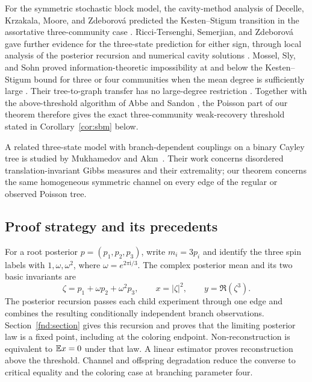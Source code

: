 For the symmetric stochastic block model, the cavity-method analysis of
Decelle, Krzakala, Moore, and Zdeborov\'a predicted the Kesten--Stigum
transition in the assortative three-community case
\cite[Section~IV.A]{DecelleEtAl2011}.
Ricci-Tersenghi, Semerjian, and Zdeborov\'a gave further evidence for the
three-state prediction for either sign, through local analysis of the
posterior recursion and numerical cavity solutions
\cite[Sections~III.D.1 and~IV.H]{RicciTersenghiEtAl2019}.
Mossel, Sly, and Sohn proved information-theoretic impossibility at and
below the Kesten--Stigum bound for three or four communities when the
mean degree is sufficiently large
\cite[Theorem~1.5]{MosselSlySohn2025}.
Their tree-to-graph transfer has no large-degree restriction
\cite[Theorem~2.1]{MosselSlySohn2025}.
Together with the above-threshold algorithm of Abbe and Sandon
\cite[Corollary~1 and Lemma~1]{AbbeSandon2018}, the Poisson part of our
theorem therefore gives the exact three-community weak-recovery threshold
stated in Corollary~\ref{cor:sbm} below.

A related three-state model with branch-dependent couplings on a binary
Cayley tree is studied by Mukhamedov and Ak{\i}n~\cite{MukhamedovAkin2026}.
Their work concerns disordered translation-invariant Gibbs measures and
their extremality; our theorem concerns the same homogeneous symmetric
channel on every edge of the regular or observed Poisson tree.

\subsection{Proof strategy and its precedents}
For a root posterior $p=(p_1,p_2,p_3)$, write $m_i=3p_i$ and identify
the three spin labels with $1,\omega,\omega^2$, where
$\omega=e^{2\pi\mathrm{i}/3}$. The complex posterior mean and its two
basic invariants are
\[
 \zeta=p_1+\omega p_2+\omega^2p_3,\qquad
 x=|\zeta|^2,\qquad y=\Re(\zeta^3).
\]
The posterior recursion passes each child experiment through one edge
and combines the resulting conditionally independent branch observations.
Section~\ref{fnd:section} gives this recursion and proves that the
limiting posterior law is a fixed point, including at the coloring
endpoint. Non-reconstruction is equivalent to $\mathbb E x=0$ under that law.
A linear estimator proves reconstruction above the threshold. Channel
and offspring degradation reduce the converse to critical equality and
the coloring case at branching parameter four.


